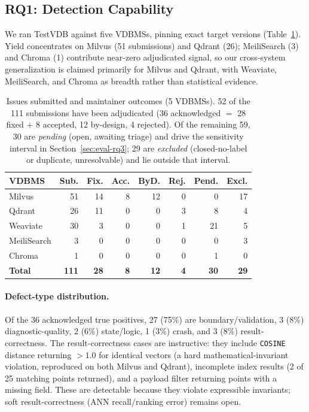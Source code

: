 \documentclass[sigconf]{acmart}
\begin{document}
\subsection{RQ1: Detection Capability}
We ran TestVDB against five VDBMSs, pinning exact target versions (Table~\ref{tab:yield}). Yield concentrates on Milvus (51 submissions) and Qdrant (26); MeiliSearch (3) and Chroma (1) contribute near-zero adjudicated signal, so our cross-system generalization is claimed primarily for Milvus and Qdrant, with Weaviate, MeiliSearch, and Chroma as breadth rather than statistical evidence.

\begin{table}[t]
\caption{Issues submitted and maintainer outcomes (5 VDBMSs). 52 of the 111 submissions have been adjudicated (36 acknowledged $=$ 28 fixed $+$ 8 accepted, 12 by-design, 4 rejected). Of the remaining 59, 30 are \emph{pending} (open, awaiting triage) and drive the sensitivity interval in Section~\ref{sec:eval-rq3}; 29 are \emph{excluded} (closed-no-label or duplicate, unresolvable) and lie outside that interval.}
\label{tab:yield}
\small
\begin{tabular}{lrrrrrrr}
\toprule
VDBMS & Sub. & Fix. & Acc. & ByD. & Rej. & Pend. & Excl. \\
\midrule
Milvus      & 51 & 14 & 8 & 12 & 0 & 0  & 17 \\
Qdrant      & 26 & 11 & 0 & 0  & 3 & 8  & 4 \\
Weaviate    & 30 & 3  & 0 & 0  & 1 & 21 & 5 \\
MeiliSearch & 3  & 0  & 0 & 0  & 0 & 0  & 3 \\
Chroma      & 1  & 0  & 0 & 0  & 0 & 1  & 0 \\
\midrule
\textbf{Total} & \textbf{111} & \textbf{28} & \textbf{8} & \textbf{12} & \textbf{4} & \textbf{30} & \textbf{29} \\
\bottomrule
\end{tabular}
\end{table}

\paragraph{Defect-type distribution.} Of the 36 acknowledged true positives, 27 (75\%) are boundary/validation, 3 (8\%) diagnostic-quality, 2 (6\%) state/logic, 1 (3\%) crash, and 3 (8\%) result-correctness. The result-correctness cases are instructive: they include \texttt{COSINE} distance returning $>1.0$ for identical vectors (a hard mathematical-invariant violation, reproduced on both Milvus and Qdrant), incomplete index results (2 of 25 matching points returned), and a payload filter returning points with a missing field. These are detectable because they violate expressible invariants; soft result-correctness (ANN recall/ranking error) remains open.
\end{document}
